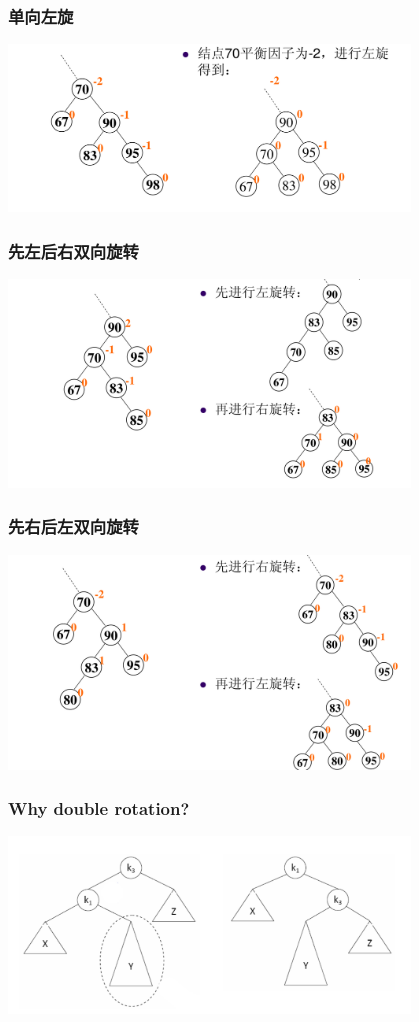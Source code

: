 \begin{frame}[fragile]
  \frametitle{单向左旋}
  \includegraphics[width=0.8\textwidth]{figs/AVL-5.png}
\end{frame}


\begin{frame}[fragile]
  \frametitle{先左后右双向旋转}
  \includegraphics[width=0.8\textwidth]{figs/AVL-6.png}
\end{frame}


\begin{frame}[fragile]
  \frametitle{先右后左双向旋转}
  \includegraphics[width=0.8\textwidth]{figs/AVL-7.png}
\end{frame}


\begin{frame}[fragile]
  \frametitle{Why double rotation?}
  \includegraphics[width=0.8\textwidth]{figs/AVL-8.png}
\end{frame}

